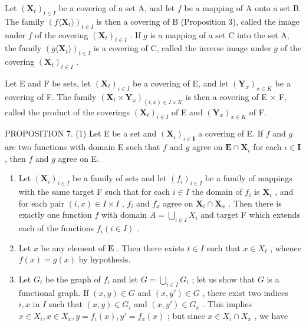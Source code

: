 Let \((\mathbf{X}_t)_{t\in I}\) be a covering of a set A, and let \(f\) be a mapping of A onto a set B. The family \((f\langle \mathbf{X}_t\rangle)_{t\in I}\) is then a covering of B (Proposition 3), called the image under \(f\) of the covering \((\mathbf{X}_t)_{t\in I}\) . If \(g\) is a mapping of a set C into the set A, the family \((\overline{g}\langle \mathbf{X}_t\rangle)_{t\in I}\) is a covering of C, called the inverse image under \(g\) of the covering \((\mathbf{X}_t)_{t\in I}\) .

Let E and F be sets, let \((\mathbf{X}_t)_{i \in I}\) be a covering of E, and let \((\mathbf{Y}_x)_{x \in K}\) be a covering of F. The family \((\mathbf{X}_t \times \mathbf{Y}_x)_{(i,x) \in I \times K}\) is then a covering of E × F, called the product of the coverings \((\mathbf{X}_t)_{i \in I}\) of E and \((\mathbf{Y}_x)_{x \in K}\) of F.

PROPOSITION 7. (1) Let E be a set and \((\mathbf{X}_{\iota})_{\iota \in \mathbf{I}}\) a covering of E. If \(f\) and \(g\) are two functions with domain E such that \(f\) and \(g\) agree on \(\mathbf{E} \cap \mathbf{X}_{\iota}\) for each \(\iota \in \mathbf{I}\) , then \(f\) and \(g\) agree on E.

\begin{enumerate}
\def\labelenumi{(\arabic{enumi})}
\setcounter{enumi}{1}
\item
  Let \((\mathbf{X}_i)_{i \in I}\) be a family of sets and let \((f_i)_{i \in I}\) be a family of mappings with the same target F such that for each \(i \in I\) the domain of \(f_i\) is \(\mathbf{X}_i\) , and for each pair \((i, x) \in I \times I\) , \(f_i\) and \(f_x\) agree on \(\mathbf{X}_i \cap \mathbf{X}_x\) . Then there is exactly one function \(f\) with domain \(A = \bigcup_{i \in I} X_i\) and target F which extends each of the functions \(f_i (i \in I)\) .
\item
  Let \(x\) be any element of \(\mathbf{E}\) . Then there exists \(t \in I\) such that \(x \in X_t\) , whence \(f(x) = g(x)\) by hypothesis.
\item
  Let \(G_{i}\) be the graph of \(f_{i}\) and let \(G = \bigcup_{i \in I} G_{i}\) ; let us show that \(G\) is a functional graph. If \((x, y) \in G\) and \((x, y') \in G\) , there exist two indices \(i, x\) in \(I\) such that \((x, y) \in G_{i}\) and \((x, y') \in G_{x}\) . This implies \(x \in X_{i}, x \in X_{x}, y = f_{i}(x), y' = f_{x}(x)\) ; but since \(x \in X_{i} \cap X_{x}\) , we have
\end{enumerate}

